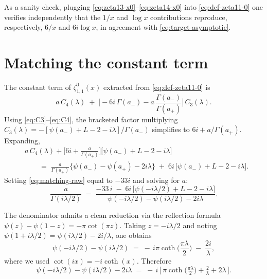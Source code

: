 \documentclass[
 aip,
 jmp,
 amsmath,amssymb,
 reprint,
 nofootinbib,
]{revtex4-2}
\begin{document}
As a sanity check, plugging \eqref{eq:zeta13-x0}--\eqref{eq:zeta14-x0} into \eqref{eq:def-zeta11-0} one verifies independently that the $1/x$ and $\log x$ contributions reproduce, respectively, $6/x$ and $6i\log x$, in agreement with \eqref{eq:target-asymptotic}.

\section{Matching the constant term}

The constant term of $\zeta_{1,1}^{0}(x)$ extracted from \eqref{eq:def-zeta11-0} is
\begin{equation}
    a\,C_{4}(\lambda) \;+\; \Big[-6i\,\Gamma(a_{-}) - a\,\frac{\Gamma(a_{-})}{\Gamma(a_{+})}\Big]\,C_{3}(\lambda).
\end{equation}
Using \eqref{eq:C3}--\eqref{eq:C4}, the bracketed factor multiplying $C_{3}(\lambda) = -[\psi(a_{-}) + L - 2 - i\lambda]/\Gamma(a_{-})$ simplifies to $6i + a/\Gamma(a_{+})$. Expanding,
\begin{equation}\label{eq:matching-raw}
\begin{aligned}
    &a\,C_{4}(\lambda) + \Big[6i + \tfrac{a}{\Gamma(a_{+})}\Big]\big[\psi(a_{-}) + L - 2 - i\lambda\big] \\
    &\qquad =\; \frac{a}{\Gamma(a_{+})}\Big\{\psi(a_{-}) - \psi(a_{+}) - 2i\lambda\Big\}
    \;+\; 6i\,\big[\psi(a_{-}) + L - 2 - i\lambda\big].
\end{aligned}
\end{equation}
Setting \eqref{eq:matching-raw} equal to $-33 i$ and solving for $a$:
\begin{equation}\label{eq:a-implicit}
    \frac{a}{\Gamma(i\lambda/2)} \;=\; \frac{-33\,i \;-\; 6i\,\big[\psi(-i\lambda/2) + L - 2 - i\lambda\big]}{\psi(-i\lambda/2) - \psi(i\lambda/2) - 2i\lambda}.
\end{equation}

The denominator admits a clean reduction via the reflection formula $\psi(z) - \psi(1-z) = -\pi\cot(\pi z)$. Taking $z = -i\lambda/2$ and noting $\psi(1+i\lambda/2) = \psi(i\lambda/2) - 2i/\lambda$, one obtains
\begin{equation}\label{eq:digamma-diff}
    \psi(-i\lambda/2) - \psi(i\lambda/2) \;=\; -\,i\pi\coth\!\Big(\frac{\pi\lambda}{2}\Big) \;-\; \frac{2i}{\lambda},
\end{equation}
where we used $\cot(ix)=-i\coth(x)$. Therefore
\begin{equation}\label{eq:denom}
    \psi(-i\lambda/2) - \psi(i\lambda/2) - 2i\lambda \;=\; -\,i\,\Big[\,\pi\coth\!\big(\tfrac{\pi\lambda}{2}\big) + \tfrac{2}{\lambda} + 2\lambda\,\Big].
\end{equation}
\end{document}
